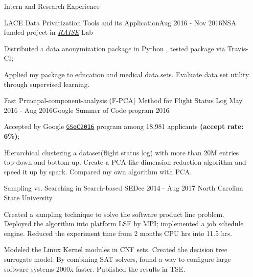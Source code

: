 \documentclass{resume} %
\begin{document}
\begin{rSection}{Intern and Research Experience}
\begin{rSubsection}{LACE Data Privatization Tools and its Application}{Aug 2016 - Nov 2016}{NSA funded project in \href{http://ai4se.net/index}{\textit{RAISE}} Lab}{}
\item Distributed a data anonymization  package in Python
, tested package via Travis-CI;
\item Applied my package to education and medical data sets. Evaluate data set utility through supervised learning.
\end{rSubsection}


\begin{rSubsection}{Fast Principal-component-analysis (F-PCA) Method for Flight Status Log} {May 2016 - Aug 2016}{Google Summer of Code program 2016}{}
\item Accepted by Google \href{https://developers.google.com/open-source/gsoc/}{\texttt{GSoC2016}}  program among 18,981 applicants \textbf{(accept rate: 6\%)};
\item Hierarchical clustering a dataset(flight status log) with more than 20M entries top-down and bottom-up. Create a PCA-like dimension reduction algorithm and speed it up by spark. Compared my own algorithm with PCA.
\end{rSubsection}  

\begin{rSubsection}{Sampling vs. Searching in Search-based SE}{Dec 2014 - Aug 2017}
{North Carolina State University}{}
\item Created a sampling technique to solve the software product line problem. Deployed the algorithm into platform LSF by MPI; implemented a job schedule engine. Reduced the experiment time from 2 months CPU hrs into 11.5 hrs.
\item Modeled the Linux Kernel modules in CNF sets. Created the decision tree surrogate model. By combining SAT solvers, found a way to configure large software systems 2000x faster. Published the results in TSE.
\end{rSubsection}


\end{rSection}
\end{document}
